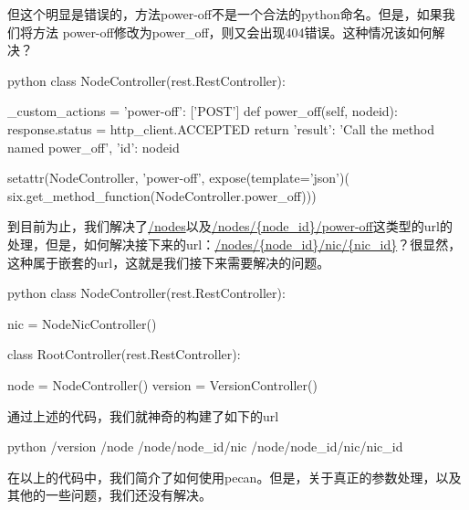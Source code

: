 但这个明显是错误的，方法power-off不是一个合法的python命名。但是，如果我们将方法
power-off修改为power\_off，则又会出现404错误。这种情况该如何解决？
\begin{code-block}{python}
class NodeController(rest.RestController):

    _custom_actions = {
        'power-off': ['POST']
    }
    def power_off(self, nodeid):
        response.status = http_client.ACCEPTED
        return {'result': 'Call the method named power_off', 'id': nodeid}


setattr(NodeController, 'power-off',
        expose(template='json')(
            six.get_method_function(NodeController.power_off)))
\end{code-block}

到目前为止，我们解决了\url{/nodes}以及\url{/nodes/{node_id}/power-off}这类型的url的
处理，但是，如何解决接下来的url：\url{/nodes/{node_id}/nic/{nic_id}}？很显然，
这种属于嵌套的url，这就是我们接下来需要解决的问题。

\begin{code-block}{python}
class NodeController(rest.RestController):

    nic = NodeNicController()


class RootController(rest.RestController):

    node = NodeController()
    version = VersionController()
\end{code-block}

通过上述的代码，我们就神奇的构建了如下的url
\begin{code-block}{python}
/version
/node
/node/{node_id}/nic
/node/{node_id}/nic/{nic_id}
\end{code-block}

在以上的代码中，我们简介了如何使用pecan。但是，关于真正的参数处理，以及其他的一些问题，我们还没有解决。

